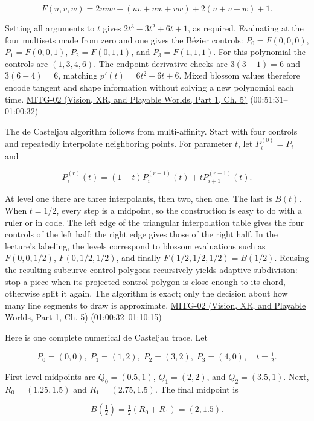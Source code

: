 \[
F(u,v,w)=2uvw-(uv+uw+vw)+2(u+v+w)+1.
\]

Setting all arguments to \(t\) gives \(2t^3-3t^2+6t+1\), as required. Evaluating at the four multisets made from zero and one gives the Bézier controls: \(P_0=F(0,0,0)\), \(P_1=F(0,0,1)\), \(P_2=F(0,1,1)\), and \(P_3=F(1,1,1)\). For this polynomial the controls are \((1,3,4,6)\). The endpoint derivative checks are \(3(3-1)=6\) and \(3(6-4)=6\), matching \(p'(t)=6t^2-6t+6\). Mixed blossom values therefore encode tangent and shape information without solving a new polynomial each time. \href{../07-Vision-XR-and-Playable-Worlds-P01/main.pdf\#nameddest=04-visual-computing-ii-ch036-mitg-02---cubic-curves}{MITG-02 (Vision, XR, and Playable Worlds, Part 1, Ch. 5)} (00:51:31--01:00:32)

The de Casteljau algorithm follows from multi-affinity. Start with four controls and repeatedly interpolate neighboring points. For parameter \(t\), let \(P_i^{(0)}=P_i\) and

\[
P_i^{(r)}(t)=(1-t)P_i^{(r-1)}(t)+tP_{i+1}^{(r-1)}(t).
\]

At level one there are three interpolants, then two, then one. The last is \(B(t)\). When \(t=1/2\), every step is a midpoint, so the construction is easy to do with a ruler or in code. The left edge of the triangular interpolation table gives the four controls of the left half; the right edge gives those of the right half. In the lecture's labeling, the levels correspond to blossom evaluations such as \(F(0,0,1/2)\), \(F(0,1/2,1/2)\), and finally \(F(1/2,1/2,1/2)=B(1/2)\). Reusing the resulting subcurve control polygons recursively yields adaptive subdivision: stop a piece when its projected control polygon is close enough to its chord, otherwise split it again. The algorithm is exact; only the decision about how many line segments to draw is approximate. \href{../07-Vision-XR-and-Playable-Worlds-P01/main.pdf\#nameddest=04-visual-computing-ii-ch036-mitg-02---cubic-curves}{MITG-02 (Vision, XR, and Playable Worlds, Part 1, Ch. 5)} (01:00:32--01:10:15)

Here is one complete numerical de Casteljau trace. Let

\[
P_0=(0,0),\; P_1=(1,2),\; P_2=(3,2),\; P_3=(4,0),\quad t=\tfrac12.
\]

First-level midpoints are \(Q_0=(0.5,1)\), \(Q_1=(2,2)\), and \(Q_2=(3.5,1)\). Next, \(R_0=(1.25,1.5)\) and \(R_1=(2.75,1.5)\). The final midpoint is

\[
B(\tfrac12)=\tfrac12(R_0+R_1)=(2,1.5).
\]

